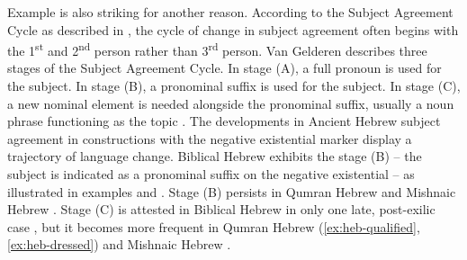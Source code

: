 ﻿\documentclass[output=paper]{langsci/langscibook}
\begin{document}
Example  is also striking for another reason. According to
the Subject Agreement Cycle as described in \citet[41]{Gelderen2011},
the cycle of change in subject agreement often begins with the
1\textsuperscript{st} and 2\textsuperscript{nd} person rather than
3\textsuperscript{rd} person. Van Gelderen describes three stages of the
Subject Agreement Cycle. In stage (A), a full pronoun is used for the
subject. In stage (B), a pronominal suffix is used for the subject. In
stage (C), a new nominal element is needed alongside the pronominal suffix,
usually a noun phrase functioning as the topic 
\parencite[41]{Gelderen2011}. The developments in Ancient Hebrew subject
agreement in constructions with the negative existential marker display a
trajectory of language change. Biblical Hebrew exhibits the stage (B) – the
subject is indicated as a pronominal suffix on the negative existential –
as illustrated in examples  and . Stage (B)
persists in Qumran Hebrew  and Mishnaic Hebrew
.
Stage (C) is attested in Biblical Hebrew in only one late, post-exilic case
, but it becomes more frequent in Qumran Hebrew
(\ref{ex:heb-qualified}, \ref{ex:heb-dressed}) and Mishnaic Hebrew
. 
\end{document}
